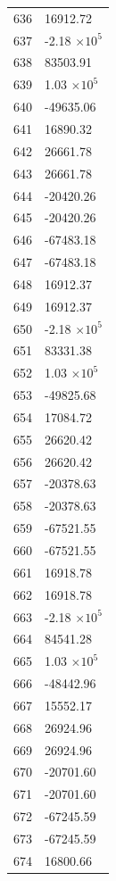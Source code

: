 \documentclass[a4paper,11pt]{article}
\begin{document}
\begin{center}
\begin{longtable}{|R{1.5cm}|R{2.6cm}|}
  636 &     16912.72 \\
  637 &        -2.18 $\times 10^{           5}$ \\
  638 &     83503.91 \\
  639 &         1.03 $\times 10^{           5}$ \\
  640 &    -49635.06 \\
  641 &     16890.32 \\
  642 &     26661.78 \\
  643 &     26661.78 \\
  644 &    -20420.26 \\
  645 &    -20420.26 \\
  646 &    -67483.18 \\
  647 &    -67483.18 \\
  648 &     16912.37 \\
  649 &     16912.37 \\
  650 &        -2.18 $\times 10^{           5}$ \\
  651 &     83331.38 \\
  652 &         1.03 $\times 10^{           5}$ \\
  653 &    -49825.68 \\
  654 &     17084.72 \\
  655 &     26620.42 \\
  656 &     26620.42 \\
  657 &    -20378.63 \\
  658 &    -20378.63 \\
  659 &    -67521.55 \\
  660 &    -67521.55 \\
  661 &     16918.78 \\
  662 &     16918.78 \\
  663 &        -2.18 $\times 10^{           5}$ \\
  664 &     84541.28 \\
  665 &         1.03 $\times 10^{           5}$ \\
  666 &    -48442.96 \\
  667 &     15552.17 \\
  668 &     26924.96 \\
  669 &     26924.96 \\
  670 &    -20701.60 \\
  671 &    -20701.60 \\
  672 &    -67245.59 \\
  673 &    -67245.59 \\
  674 &     16800.66 \\

\end{longtable}
\end{center}
\end{document}
